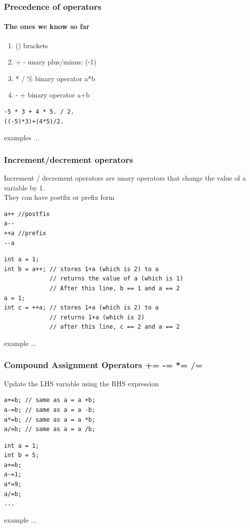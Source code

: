 \documentclass[10pt]{beamer}
\begin{document}
\begin{frame}[fragile]
  \frametitle{Precedence of operators}
  \framesubtitle{The ones we know so far}
  \centering
  \begin{enumerate}
    \item () brackets
    \item + - unary plus/minus: (-1)
    \item * / \% binary operator a*b
    \item - + binary operator a+b
  \end{enumerate}

\begin{lstlisting}
-5 * 3 + 4 * 5. / 2. 
((-5)*3)+(4*5)/2.
\end{lstlisting}

examples ...

\end{frame}

\begin{frame}[fragile]
  \frametitle{Increment/decrement operators}
  Increment / decrement operators are unary operators that change the value of a variable by 1.\\
  They can have postfix or prefix form

\begin{lstlisting}
a++ //postfix
a--
++a //prefix
--a
\end{lstlisting}

\begin{lstlisting}
int a = 1;
int b = a++; // stores 1+a (which is 2) to a
             // returns the value of a (which is 1)
             // After this line, b == 1 and a == 2
a = 1;
int c = ++a; // stores 1+a (which is 2) to a
             // returns 1+a (which is 2)
             // after this line, c == 2 and a == 2
\end{lstlisting}

example ...

\end{frame}

\begin{frame}[fragile]
  \frametitle{Compound Assignment Operators += -= *= /=}
  Update the LHS variable using the RHS expression

\begin{lstlisting}
a+=b; // same as a = a +b;
a-=b; // same as a = a -b;
a*=b; // same as a = a *b;
a/=b; // same as a = a /b;
\end{lstlisting}

\begin{lstlisting}
int a = 1;
int b = 5;
a+=b;
a-=1;
a*=9;
a/=b;
...
\end{lstlisting}

example ...

\end{frame}
\end{document}

